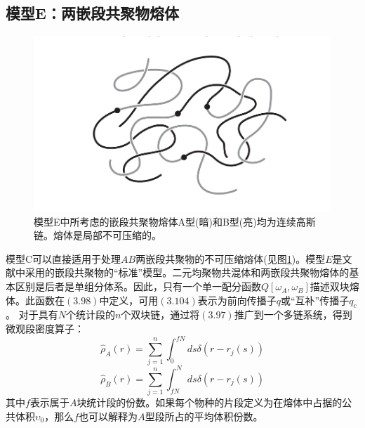 \subsection{模型E：两嵌段共聚物熔体}

\begin{figure}[H]
	\centering   
	\includegraphics[width=12cm]{./figures/2.png}
	\caption{模型E中所考虑的嵌段共聚物熔体A型(暗)和B型(亮)均为连续高斯链。熔体是局部不可压缩的。}
	\label{模型E}
\end{figure}
模型C可以直接适用于处理$AB$两嵌段共聚物的不可压缩熔体(见图\ref{模型E})。模型$E$是文献中采用的嵌段共聚物的“标准”模型。二元均聚物共混体和两嵌段共聚物熔体的基本区别是后者是单组分体系。因此，只有一个单一配分函数$Q[\omega_{A},\omega_{B}]$描述双块熔体。此函数在$(3.98)$中定义，可用$(3.104)$表示为前向传播子$q$或“互补”传播子$q_{c}$。 对于具有$N$个统计段的$n$个双块链，通过将$(3.97)$推广到一个多链系统，得到微观段密度算子：\\
\begin{equation}
\hat{ \rho }_{A}(r)=\sum_{j=1}^{n} \int _{0}^{fN} d s \delta (r-r_{j}(s))
\end{equation}
\begin{equation}
\hat{ \rho }_{B}(r)=\sum_{j=1}^{n} \int _{fN}^{N} d s \delta (r-r_{j}(s))
\end{equation}
其中$f$表示属于$A$块统计段的份数。如果每个物种的片段定义为在熔体中占据的公共体积$\upsilon_0$，那么$f$也可以解释为$A$型段所占的平均体积份数。\\


